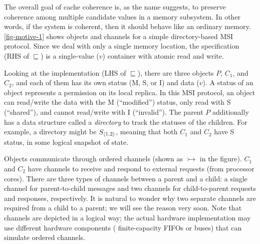 The overall goal of cache coherence is, as the name suggests, to preserve coherence among multiple candidate values in a memory subsystem.
In other words, if the system is coherent, then it should behave like an ordinary memory.
\autoref{fig-motive-1} shows objects and channels for a simple directory-based MSI protocol.
Since we deal with only a single memory location, the specification (RHS of $\sqsubseteq$) is a single-value ($v$) container with atomic read and write.

Looking at the implementation (LHS of $\sqsubseteq$), there are three objects $P$, $C_1$, and $C_2$, and each of them has its own status (M, S, or I) and data ($v$).
A status of an object represents a permission on its local replica.
In this MSI protocol, an object can read/write the data with the M (``modified'') status, only read with S (``shared''), and cannot read/write with I (``invalid'').
The parent $P$ additionally has a data structure called a \emph{directory} to track the statuses of the children.
For example, a directory might be $S_{\langle 1, 2 \rangle}$, meaning that both $C_1$ and $C_2$ have S status, in some logical snapshot of state.

Objects communicate through ordered channels (shown as $\rightarrowtail$ in the figure).
$C_1$ and $C_2$ have channels to receive and respond to external requests (from processor cores).
There are three types of channels between a parent and a child: a single channel for parent-to-child messages and two channels for child-to-parent requests and responses, respectively.
It is natural to wonder why two separate channels are required from a child to a parent; we will see the reason very soon.
Note that channels are depicted in a logical way; the actual hardware implementation may use different hardware components (\eg{} finite-capacity FIFOs or buses) that can simulate ordered channels.

